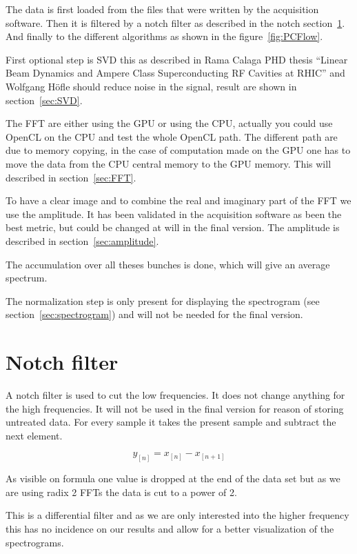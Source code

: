 	The data is first loaded from the files that were written by the acquisition software. Then it is filtered by a notch filter as described in the notch section~\ref{sec:notch}. And finally to the different algorithms as shown in the figure~\ref{fig:PCFlow}.

	First optional step is \gls{SVD} this as described in Rama Calaga PHD thesis ``Linear Beam Dynamics and Ampere Class Superconducting RF Cavities at RHIC''\cite{calaga06} and Wolfgang H{\"o}f\/le\cite{HofleChamonix12} should reduce noise in the signal, result are shown in section~\ref{sec:SVD}.

	The \gls{FFT} are either using the \gls{GPU} or using the \gls{CPU}, actually you could use \gls{OpenCL} on the \gls{CPU} and test the whole \gls{OpenCL} path. The different path are due to memory copying, in the case of computation made on the \gls{GPU} one has to move the data from the \gls{CPU} central memory to the \gls{GPU} memory. This will described in section~\ref{sec:FFT}.

	To have a clear image and to combine the real and imaginary part of the \gls{FFT} we use the amplitude. It has been validated in the acquisition software as been the best metric, but could be changed at will in the final version. The amplitude is described in section~\ref{sec:amplitude}.

	The accumulation over all theses bunches is done, which will give an average spectrum.

	The normalization step is only present for displaying the spectrogram (see section~\ref{sec:spectrogram}) and will not be needed for the final version.
 
\section{Notch filter}
\label{sec:notch}

A notch filter is used to cut the low frequencies. It does not change anything for the high frequencies. It will not be used in the final version for reason of storing untreated data. For every sample it takes the present sample and subtract the next element. 

$$y_{[n]} = x_{[n]} - x_{[n + 1]}$$

As visible on formula one value is dropped at the end of the data set but as we are using radix 2 \glspl{FFT} the data is cut to a power of 2.

This is a differential filter and as we are only interested into the higher frequency this has no incidence on our results and allow for a better visualization of the spectrograms.

